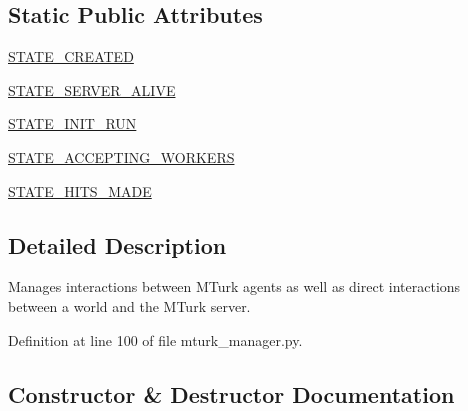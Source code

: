 \subsection*{Static Public Attributes}
\begin{DoxyCompactItemize}
\item 
\hyperlink{classparlai_1_1mturk_1_1core_1_1mturk__manager_1_1MTurkManager_a68e114fed1b4dd106918d9c0de86075b}{S\+T\+A\+T\+E\+\_\+\+C\+R\+E\+A\+T\+ED}
\item 
\hyperlink{classparlai_1_1mturk_1_1core_1_1mturk__manager_1_1MTurkManager_a614fcb4f1df8b5c9c453dcd55e2dd29c}{S\+T\+A\+T\+E\+\_\+\+S\+E\+R\+V\+E\+R\+\_\+\+A\+L\+I\+VE}
\item 
\hyperlink{classparlai_1_1mturk_1_1core_1_1mturk__manager_1_1MTurkManager_a5ea29af39d36c6ab07fb33b3d41885a9}{S\+T\+A\+T\+E\+\_\+\+I\+N\+I\+T\+\_\+\+R\+UN}
\item 
\hyperlink{classparlai_1_1mturk_1_1core_1_1mturk__manager_1_1MTurkManager_a04a9154321ca158c5d5a9e35f17fb4e9}{S\+T\+A\+T\+E\+\_\+\+A\+C\+C\+E\+P\+T\+I\+N\+G\+\_\+\+W\+O\+R\+K\+E\+RS}
\item 
\hyperlink{classparlai_1_1mturk_1_1core_1_1mturk__manager_1_1MTurkManager_a615de083816ca78aac6ca7208b24ed1c}{S\+T\+A\+T\+E\+\_\+\+H\+I\+T\+S\+\_\+\+M\+A\+DE}
\end{DoxyCompactItemize}


\subsection{Detailed Description}
\begin{DoxyVerb}Manages interactions between MTurk agents as well as direct interactions between a
world and the MTurk server.
\end{DoxyVerb}
 

Definition at line 100 of file mturk\+\_\+manager.\+py.



\subsection{Constructor \& Destructor Documentation}
\mbox{\label{classparlai_1_1mturk_1_1core_1_1mturk__manager_1_1MTurkManager_a0ad49b45ee05a62062d4e680c6e6323e}} 
